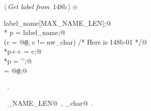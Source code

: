 \documentclass[a4paper]{report}
\begin{document}
\begin{flushleft} \small
\begin{minipage}{\linewidth}\label{scrap324}\raggedright\small
{} $\langle\,${\it Get label from}\nobreak\ {\footnotesize {148b}}$\,\rangle\equiv$
\vspace{-1ex}
\begin{list}{}{} \item
\mbox{}\verb@char  label_name[MAX_NAME_LEN];@\\
\mbox{}\verb@char * p = label_name;@\\
\mbox{}\verb@while (c = @{\tt @}, c != nw_char) /* Here is 148b-01 */@\\
\mbox{}\verb@   *p++ = c;@\\
\mbox{}\verb@*p = '\0';@\\
\mbox{}\verb@c = @{\tt @};@\\
\mbox{}\verb@@{\NWsep}
\end{list}
\vspace{-1.5ex}
\footnotesize
\begin{list}{}{\setlength{\itemsep}{-\parsep}\setlength{\itemindent}{-\leftmargin}}
\item \NWtxtMacroRefIn\ .
\item \NWtxtIdentsUsed\nobreak\  \verb@MAX_NAME_LEN@\nobreak\ , \verb@nw_char@\nobreak\ .
\item{}
\end{list}
\end{minipage}\vspace{4ex}
\end{flushleft}
\end{document}
